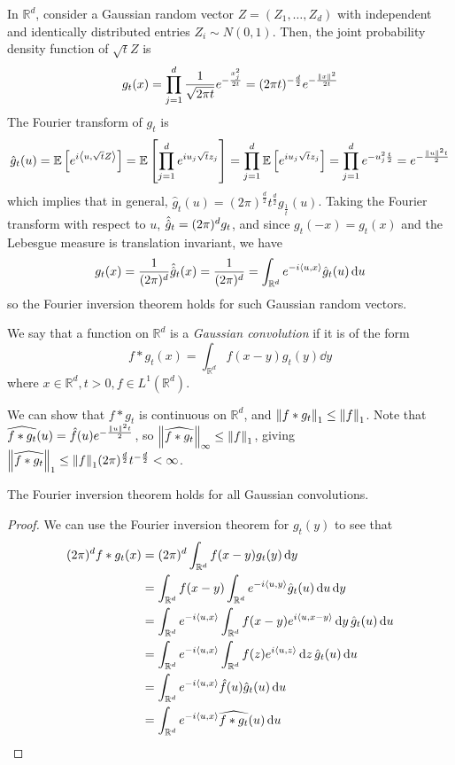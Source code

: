 In \( \mathbb R^d \), consider a Gaussian random vector \( Z = (Z_1, \dots, Z_d) \) with independent and identically distributed entries \( Z_i \sim N(0,1) \).
Then, the joint probability density function of \( \sqrt{t}Z \) is
\[ g_t(x) = \prod_{j=1}^d \frac{1}{\sqrt{2\pi t}} e^{-\frac{x_j^2}{2t}} = (2\pi t)^{-\frac{d}{2}} e^{-\frac{\norm{x}^2}{2t}} \]
The Fourier transform of \( g_t \) is
\[ \hat g_t(u) = \mathbb{E}\left[{e^{i\left\langle{u,\sqrt{t}Z}\right\rangle}}\right] = \mathbb{E}\left[{\prod_{j=1}^d e^{iu_j \sqrt{t} z_j}}\right] = \prod_{j=1}^d \mathbb{E}\left[{e^{iu_j \sqrt{t} z_j}}\right] = \prod_{j=1}^d e^{-u_j^2 \frac{t}{2}} = e^{-\frac{\norm{u}^2 t}{2}} \]
which implies that in general, \( \hat g_t(u) = (2\pi)^{\frac{d}{2}} t^{\frac{d}{2}} g_{\frac{1}{t}}(u) \).
Taking the Fourier transform with respect to \( u \), \( \hat{\hat{g}}_t = (2\pi)^d g_t \), and since \( g_t(-x) = g_t(x) \) and the Lebesgue measure is translation invariant, we have
\[ g_t(x) = \frac{1}{(2\pi)^d} \hat{\hat{g}}_t(x) = \frac{1}{(2\pi)^d} = \int_{\mathbb R^d} e^{-i\left\langle{u,x}\right\rangle} \hat g_t(u) \dd{u} \]
so the Fourier inversion theorem holds for such Gaussian random vectors.
\begin{definition}
	We say that a function on \( \mathbb R^d \) is a \emph{Gaussian convolution} if it is of the form
	\[ f \ast g_t(x) = \int_{\mathbb R^d} f(x-y) g_t(y) \dd{y} \]
	where \( x \in \mathbb R^d, t > 0, f \in L^1(\mathbb R^d) \).
\end{definition}
We can show that \( f \ast g_t \) is continuous on \( \mathbb R^d \), and \( \norm{f \ast g_t}_1 \leq \norm{f}_1 \).
Note that \( \widehat{f \ast g_t}(u) = \hat f(u) e^{-\frac{\norm{u}^2 t}{2}} \), so \( \norm{\widehat{f \ast g_t}}_\infty \leq \norm{f}_1 \), giving \( \norm{\widehat{f \ast g_t}}_1 \leq \norm{f}_1 (2\pi)^{\frac{d}{2}} t^{-\frac{d}{2}} < \infty \).
\begin{lemma}
	The Fourier inversion theorem holds for all Gaussian convolutions.
\end{lemma}
\begin{proof}
	We can use the Fourier inversion theorem for \( g_t(y) \) to see that
	\begin{align*}
		(2\pi)^d f \ast g_t(x) &= (2\pi)^d \int_{\mathbb R^d} f(x-y) g_t(y) \dd{y} \\
		&= \int_{\mathbb R^d} f(x-y) \int_{\mathbb R^d} e^{-i\left\langle{u,y}\right\rangle} \hat g_t(u) \dd{u} \dd{y} \\
		&= \int_{\mathbb R^d} e^{-i\left\langle{u,x}\right\rangle} \int_{\mathbb R^d} f(x-y) e^{i\left\langle{u,x-y}\right\rangle} \dd{y} \hat g_t(u) \dd{u} \\
		&= \int_{\mathbb R^d} e^{-i\left\langle{u,x}\right\rangle} \int_{\mathbb R^d} f(z) e^{i\left\langle{u,z}\right\rangle} \dd{z} \hat g_t(u) \dd{u} \\
		&= \int_{\mathbb R^d} e^{-i\left\langle{u,x}\right\rangle} \hat f(u) \hat g_t(u) \dd{u} \\
		&= \int_{\mathbb R^d} e^{-i\left\langle{u,x}\right\rangle} \widehat{f \ast g_t}(u) \dd{u}
	\end{align*}
\end{proof}
